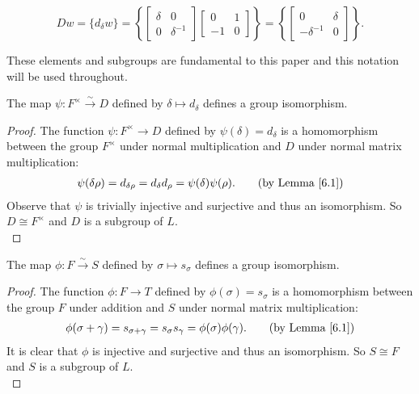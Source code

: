 \begin{equation} \label{antidiag} Dw = \{ d_\delta w \} =  \left\{  \begin{bmatrix} \delta & 0 \\ 0 & \delta^{-1} \end{bmatrix} \begin{bmatrix} 0 & 1 \\ -1 & 0 \end{bmatrix} \right\} = \left\{ \begin{bmatrix} 0 & \delta \\ -\delta^{-1} & 0 \end{bmatrix}  \right\}. \end{equation}

These elements and subgroups are fundamental to this paper and this notation will be used throughout.

\begin{lemma}
\label{SpecialSubgroups.D_iso_units}
\leanok
The map $\psi : F^\times \overset{\sim}{\rightarrow} D$ defined by $\delta \mapsto d_\delta$ defines a group isomorphism.
\end{lemma}

\begin{proof}
    The function $\psi: F^\times \rightarrow D$ defined by $\psi(\delta) = d_\delta$ is a homomorphism between the group $F^\times$ under normal multiplication and $D$ under normal matrix multiplication:
\begin{align*} \psi(\delta \rho) = d_{\delta \rho} =  d_\delta d_\rho = \psi(\delta) \psi(\rho). \tag{by Lemma \ref{6.1}}
\end{align*}
Observe that $\psi$ is trivially injective and surjective and thus an isomorphism. So $D\cong F^\times$ and $D$ is a subgroup of $L$.\\
\end{proof}



\begin{lemma}
\label{SpecialSubgroups.S_iso_F, SpecialMatrices.s_mul_s_eq_s_add}
\leanok
    The map $\phi : F \overset{\sim}{\rightarrow} S$ defined by $\sigma \mapsto s_\sigma$ defines a group isomorphism.
\end{lemma}

\begin{proof}
     The function $\phi: F \rightarrow T$ defined by $\phi(\sigma) = s_\sigma$ is a homomorphism between the group $F$ under addition and $S$ under normal matrix multiplication:
\begin{align*} \phi(\sigma + \gamma) = s_{\sigma + \gamma} = s_\sigma s_\gamma = \phi(\sigma) \phi(\gamma). \tag{by Lemma \ref{6.1}}
\end{align*}
It is clear that $\phi$ is injective and surjective and thus an isomorphism. So $ S \cong F$ and $S$ is a subgroup of $L$. \\
\end{proof}



